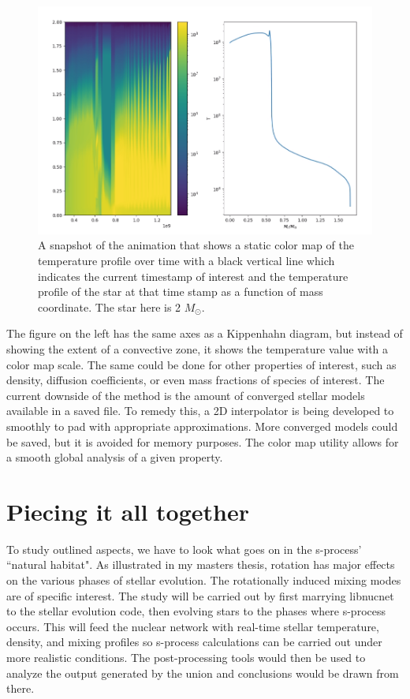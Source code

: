 \documentclass{article}
\begin{document}
\begin{figure}[H]
    \centerline{\includegraphics[scale = 0.5]{images/movie_slice.png}}
    \caption{A snapshot of the animation that shows a static color map of the temperature profile over time with a black vertical 
    line which indicates the current timestamp of interest and the temperature profile of the star at that time stamp as a function 
    of mass coordinate. The star here is 2 $M_{\odot}$.}
    \label{movie_cut}
\end{figure}

The figure on the left has the same axes as a Kippenhahn diagram, but instead of showing the extent of a convective zone, it shows 
the temperature value with a color map scale. The same could be done for other properties of interest, such as density, diffusion 
coefficients, or even mass fractions of species of interest. The current downside of the method is the amount of converged stellar 
models available in a saved file. To remedy this, a 2D interpolator is being developed to smoothly to pad with appropriate 
approximations. More converged models could be saved, but it is avoided for memory purposes. The color map utility allows for a 
smooth global analysis of a given property.

\section*{Piecing it all together}

To study outlined aspects, we have to look what goes on in the s-process' ``natural habitat". As illustrated in my masters thesis, rotation 
has major effects on the various phases of stellar evolution. The rotationally induced mixing modes are of specific interest. The study 
will be carried out by first marrying libnucnet to the stellar evolution code, then evolving stars to the phases where s-process occurs. 
This will feed the nuclear network with real-time stellar temperature, density, and mixing profiles so s-process calculations can be 
carried out under more realistic conditions. The post-processing tools would then be used to analyze the output generated by the union 
and conclusions would be drawn from there.

\singlespacing



\end{document}
